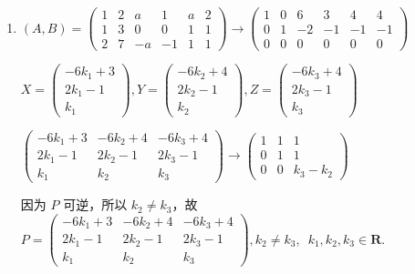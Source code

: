 \begin{enumerate}
\begin{enumerate}
            \item $(A,B)=\begin{pmatrix}1 & 2 & a & 1 & a & 2 \\ 1 & 3 & 0 & 0 & 1 & 1 \\ 2 & 7 & -a & -1 & 1 & 1\end{pmatrix}\rightarrow\begin{pmatrix}1 & 0 & 6 & 3 & 4 & 4 \\ 0 & 1 & -2 & -1 & -1 & -1 \\ 0 & 0 & 0 & 0 & 0 & 0\end{pmatrix}$

                    $X = \begin{pmatrix}-6k_1+3 \\ 2k_1-1 \\ k_1\end{pmatrix},Y = \begin{pmatrix}-6k_2+4 \\ 2k_2-1 \\ k_2\end{pmatrix},Z = \begin{pmatrix}-6k_3+4 \\ 2k_3-1 \\ k_3\end{pmatrix}$

                    $\begin{pmatrix}-6k_1+3 & -6k_2+4 & -6k_3+4 \\ 2k_1-1 & 2k_2-1 & 2k_3-1 \\ k_1 & k_2 & k_3\end{pmatrix}\rightarrow \begin{pmatrix}1 & 1 & 1 \\ 0 & 1 & 1 \\ 0 & 0 & k_3-k_2\end{pmatrix}$

                    因为 $P$ 可逆，所以 $k_2\neq k_3$，故 $P=\begin{pmatrix}-6k_1+3 & -6k_2+4 & -6k_3+4 \\ 2k_1-1 & 2k_2-1 & 2k_3-1 \\ k_1 & k_2 & k_3\end{pmatrix},k_2\neq k_3,\enspace k_1,k_2,k_3 \in \mathbf{R}$.
        \end{enumerate}


\end{enumerate}
